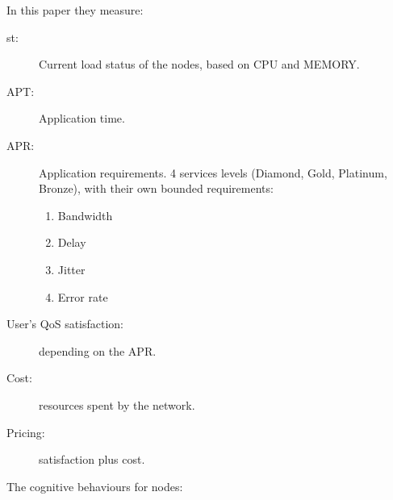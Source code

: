 In this paper \cite{cogMRT} they measure:\\ 

\begin{description}
\item [st:] Current load status of the nodes, based on CPU and MEMORY.
\item [APT:] Application time.
\item [APR:] Application requirements. 4 services levels (Diamond, Gold, Platinum, Bronze), with their own bounded requirements:
	\begin{enumerate}
	\item Bandwidth 
	\item Delay
	\item Jitter
	\item Error rate
	\end{enumerate}
\item [User's QoS satisfaction:] depending on the APR.
\item [Cost:] resources spent by the network.
\item[Pricing:] satisfaction plus cost.\\
\end{description}

The cognitive behaviours for nodes:\\


